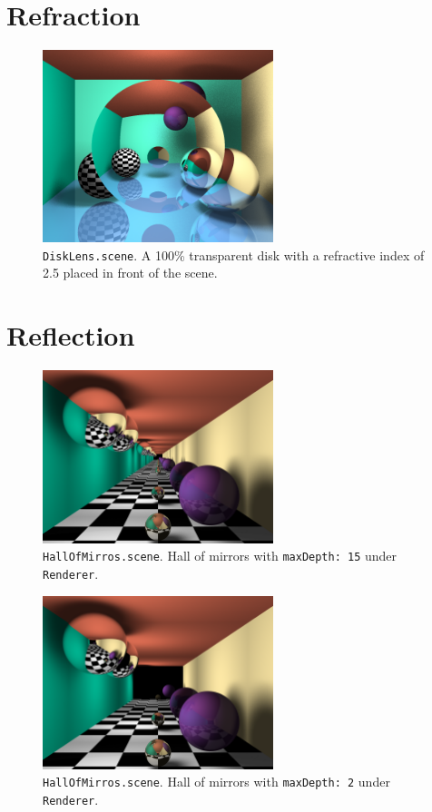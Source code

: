 \documentclass{article}
\begin{document}
\section{Refraction}

\begin{figure}[H]
    \centering
    \includegraphics[width=0.6\textwidth]{./examples/DiskLens.png}
    \caption{\texttt{DiskLens.scene}. A 100\% transparent disk with a refractive index of 2.5 placed in front of the scene.}
\end{figure}

\section{Reflection}

\begin{figure}[H]
    \centering
    \includegraphics[width=0.6\textwidth]{./examples/HallOfMirrors.png}
    \caption{\texttt{HallOfMirros.scene}. Hall of mirrors with \texttt{maxDepth: 15} under \texttt{Renderer}.}
\end{figure}

\begin{figure}[H]
    \centering
    \includegraphics[width=0.6\textwidth]{./examples/HallOfMirrorsDepth2.png}
    \caption{\texttt{HallOfMirros.scene}. Hall of mirrors with \texttt{maxDepth: 2} under \texttt{Renderer}.}
\end{figure}
\end{document}
